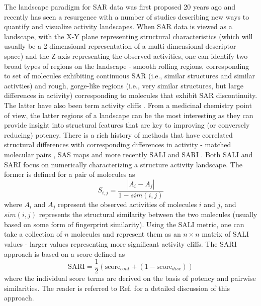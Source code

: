 \documentclass[letterpaper, 12pt]{article}
\begin{document}
The landscape paradigm for SAR data was first proposed 20 years ago
\cite{Johnson:1990ys} and recently has seen a resurgence with a number
of studies describing new ways to quantify and visualize activity
landscapes. When SAR data is viewed as a landscape, with the X-Y plane
representing structural characteristics (which will usually be a
2-dimensional representation of a multi-dimensional descriptor space)
and the Z-axis representing the observed activities, one can identify
two broad types of regions on the landscape - smooth rolling regions,
corresponding to set of molecules exhibiting continuous SAR (i.e.,
similar structures and similar activties) and rough, gorge-like
regions (i.e., very similar structures, but large differences in
activity) corresponding to molecules that exhibit SAR
discontinuity. The latter have also been term activity cliffs
\cite{Maggiora:2006aa}. From a medicinal chemistry point of view, the
latter regions of a landscape can be the most interesting as they can
provide insight into structural features that are key to improving (or
conversely reducing) potency. There is a rich history of methods that
have correlated structural differences with corresponding differences
in activity - matched molecular pairs \cite{Leach:2006aa}, SAS maps
\cite{Maggiora:2011kx} and more recently SALI \cite{Guha:2008aa}
and SARI \cite{Peltason:2007aa}. Both SALI and SARI focus on
numerically characterizing a structure activity landscape. The former
is defined for a pair of molecules as
\begin{equation}
  \label{eq:1}
  S_{i,j} = \frac{|A_i - A_j|}{1 - sim(i,j)}
\end{equation}
where $A_i$ and $A_j$ represent the observed activities of molecules
$i$ and $j$, and $sim(i,j)$ represents the structural similarity
between the two molecules (usually based on some form of fingerprint
similarity). Using the SALI metric, one can take a collection of $n$
molecules and represent them as an $n \times n$ matrix of SALI values
- larger values representing more significant activity cliffs. The
SARI approach is based on a score defined as 
\begin{equation}
  \label{eq:2}
  \mathrm{SARI} = \frac{1}{2} \left(\mathrm{score}_{cont} + (1 -
    \mathrm{score}_{disc}) \right)
\end{equation}
where the individual score terms are derived on the basis of potency
and pairwise similarities. The reader is referred to
Ref.  for a detailed discussion of this
approach.
\end{document}
